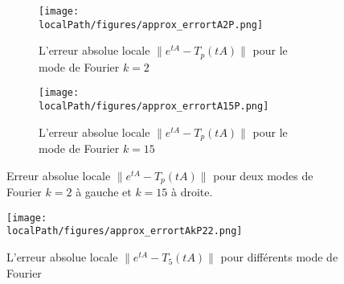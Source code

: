 \begin{figure}
  \begin{subfigure}{.5\textwidth}
    \centering
    \texttt{[image: \\localPath/figures/approx\_errortA2P.png]}
    \caption{L'erreur absolue locale $\|e^{tA}-T_p(tA)\|$ pour le mode de Fourier $k=2$}
  \end{subfigure}
  \begin{subfigure}{.5\textwidth}
    \centering
    \texttt{[image: \\localPath/figures/approx\_errortA15P.png]}
    \caption{L'erreur absolue locale $\|e^{tA}-T_p(tA)\|$ pour le mode de Fourier $k=15$}
  \end{subfigure}
  \caption{Erreur absolue locale $\|e^{tA}-T_p(tA)\|$ pour deux modes de Fourier $k=2$ à gauche et $k=15$ à droite.}
\end{figure}

\begin{figure}
  \centering
  \texttt{[image: \\localPath/figures/approx\_errortAkP22.png]}
  \caption{L'erreur absolue locale $\|e^{tA}-T_5(tA)\|$ pour différents mode de Fourier}
\end{figure}


